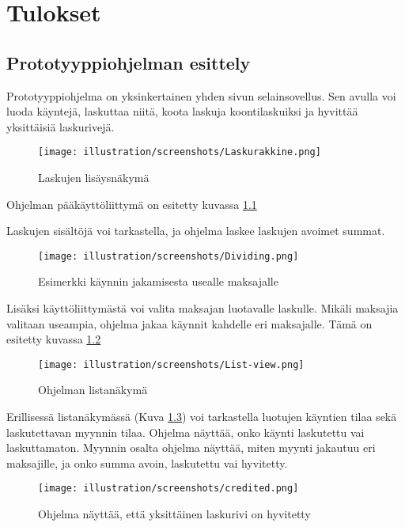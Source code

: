 \hypertarget{tulokset}{%
\chapter{Tulokset}\label{tulokset}}

\hypertarget{prototyyppiohjelman-esittely}{%
\section{Prototyyppiohjelman
esittely}\label{prototyyppiohjelman-esittely}}

Prototyyppiohjelma on yksinkertainen yhden sivun selainsovellus. Sen
avulla voi luoda käyntejä, laskuttaa niitä, koota laskuja
koontilaskuiksi ja hyvittää yksittäisiä laskurivejä.

\begin{figure}
\centering
\texttt{[image: illustration/screenshots/Laskurakkine.png]}
\caption{\label{rakkine_default-view}Laskujen lisäysnäkymä}
\end{figure}

Ohjelman pääkäyttöliittymä on esitetty kuvassa
\ref{rakkine_default-view}

Laskujen sisältöjä voi tarkastella, ja ohjelma laskee laskujen avoimet
summat.

\begin{figure}
\centering
\texttt{[image: illustration/screenshots/Dividing.png]}
\caption{\label{rakkine_dividing}Esimerkki käynnin jakamisesta usealle
maksajalle}
\end{figure}

Lisäksi käyttöliittymästä voi valita maksajan luotavalle laskulle.
Mikäli maksajia valitaan useampia, ohjelma jakaa käynnit kahdelle eri
maksajalle. Tämä on esitetty kuvassa \ref{rakkine_dividing}

\begin{figure}
\centering
\texttt{[image: illustration/screenshots/List-view.png]}
\caption{\label{rakkine_list-view}Ohjelman listanäkymä}
\end{figure}

Erillisessä listanäkymässä (Kuva \ref{rakkine_list-view}) voi
tarkastella luotujen käyntien tilaa sekä laskutettavan myynnin tilaa.
Ohjelma näyttää, onko käynti laskutettu vai laskuttamaton. Myynnin
osalta ohjelma näyttää, miten myynti jakautuu eri maksajille, ja onko
summa avoin, laskutettu vai hyvitetty.

\begin{figure}
\centering
\texttt{[image: illustration/screenshots/credited.png]}
\caption{\label{rakkine_credited}Ohjelma näyttää, että yksittäinen
laskurivi on hyvitetty}
\end{figure}

